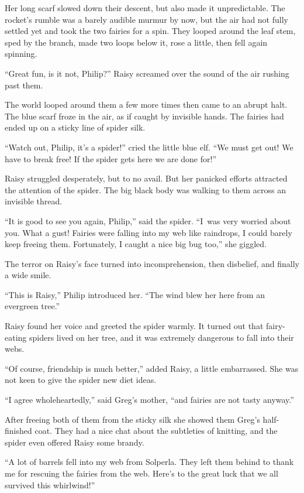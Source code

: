 \documentclass[10pt]{memoir}
\begin{document}
Her long scarf slowed down their descent, but also made it unpredictable. The
rocket's rumble was a barely audible murmur by now, but the air had not fully
settled yet and took the two fairies for a spin. They looped around the leaf
stem, sped by the branch, made two loops below it, rose a little, then fell
again spinning.

``Great fun, is it not, Philip?'' Raisy screamed over the sound of the air
rushing past them.

The world looped around them a few more times then came to an abrupt halt. The
blue scarf froze in the air, as if caught by invisible hands. The fairies had
ended up on a sticky line of spider silk.

``Watch out, Philip, it's a spider!'' cried the little blue elf. ``We must get
out! We have to break free! If the spider gets here we are done for!''

Raisy struggled desperately, but to no avail. But her panicked efforts
attracted the attention of the spider. The big black body was walking to them
across an invisible thread.

``It is good to see you again, Philip,'' said the spider. ``I~was very worried
about you. What a gust! Fairies were falling into my web like raindrops, I
could barely keep freeing them. Fortunately, I caught a nice big bug too,'' she
giggled.

The terror on Raisy's face turned into incomprehension, then disbelief, and
finally a wide smile.

``This is Raisy,'' Philip introduced her. ``The wind blew her here from an
evergreen tree.''

Raisy found her voice and greeted the spider warmly. It turned out that
fairy-eating spiders lived on her tree, and it was extremely dangerous to fall
into their webs.

``Of course, friendship is much better,'' added Raisy, a little embarrassed.
She was not keen to give the spider new diet ideas.

``I agree wholeheartedly,'' said Greg's mother, ``and fairies are not tasty
anyway.''

After freeing both of them from the sticky silk she showed them Greg's
half-finished coat. They had a nice chat about the subtleties of knitting, and
the spider even offered Raisy some brandy.

``A lot of barrels fell into my web from Solperla. They left them behind to
thank me for rescuing the fairies from the web. Here's to the great luck that
we all survived this whirlwind!''
\end{document}
